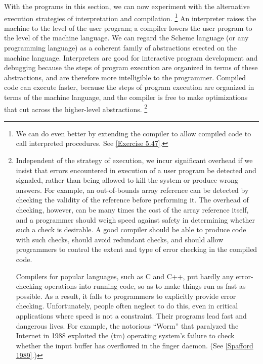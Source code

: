 With the programs in this section, we can now experiment with the alternative execution strategies of interpretation and compilation.%
\footnote{
	We can do even better by extending the compiler to allow compiled code to call interpreted procedures.
	See \cref{Exercise 5.47}.
}
An interpreter raises the machine to the level of the user program;
a compiler lowers the user program to the level of the machine language.
We can regard the Scheme language (or any programming language) as a coherent family of abstractions erected on the machine language.
Interpreters are good for interactive program development and debugging because the steps of program execution are organized in terms of these abstractions, and are therefore more intelligible to the programmer.
Compiled code can execute faster, because the steps of program execution are organized in terms of the machine language, and the compiler is free to make optimizations that cut across the higher-level abstractions.%
\footnote{
	Independent of the strategy of execution, we incur significant overhead if we insist that errors encountered in execution of a user program be detected and signaled, rather than being allowed to kill the system or produce wrong answers.
	For example, an out-of-bounds array reference can be detected by checking the validity of the reference before performing it.
	The overhead of checking, however, can be many times the cost of the array reference itself, and a programmer should weigh speed against safety in determining whether such a check is desirable.
	A good compiler should be able to produce code with such checks, should avoid redundant checks, and should allow programmers to control the extent and type of error checking in the compiled code.

	Compilers for popular languages, such as C and C++, put hardly any error-checking operations into running code, so as to make things run as fast as possible.
	As a result, it falls to programmers to explicitly provide error checking.
	Unfortunately, people often neglect to do this, even in critical applications where speed is not a constraint.
	Their programs lead fast and dangerous lives.
	For example, the notorious “Worm” that paralyzed the Internet in 1988 exploited the (tm) operating system’s failure to check whether the input buffer has overflowed in the finger daemon.
	(See \cref{Spafford 1989}.)
}

